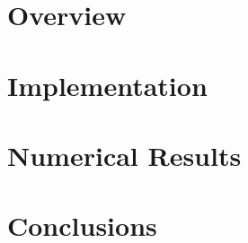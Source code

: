
\maketitle





\newpage
\tableofcontents


\newpage
\section{Overview}


\newpage
\section{Implementation}


\newpage
\section{Numerical Results}


\newpage
\section{Conclusions}


\newpage
{}

\printbibliography